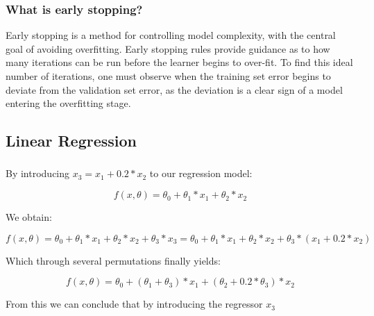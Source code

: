 \documentclass[12pt,a4paper]{article}
\begin{document}
\subsubsection*{What is early stopping?}

Early stopping is a method for controlling model complexity, with the central goal of avoiding overfitting. Early stopping rules provide guidance as to how many iterations can be run before the learner begins to over-fit. To find this ideal number of iterations, one must observe when the training set error begins to deviate from the validation set error, as the deviation is a clear sign of a model entering the overfitting stage.

\subsection*{Linear Regression}

\subsubsection{}

By introducing $x_3 = x_1 + 0.2 * x_2$ to our regression model:

\begin{equation*}
	f(x,\theta) = \theta_0 + \theta_1 * x_1 + \theta_2 * x_2
\end{equation*}

We obtain:

\begin{equation*}
	f(x,\theta) = \theta_0 + \theta_1 * x_1 + \theta_2 * x_2 + \theta_3 * x_3
	=
	\theta_0 + \theta_1 * x_1 + \theta_2 * x_2 + \theta_3 * (x_1 + 0.2 * x_2)
\end{equation*}

Which through several permutations finally yields:

\begin{equation*}
	f(x,\theta) =
	\theta_0 + (\theta_1 + \theta_3) * x_1 + (\theta_2 + 0.2 * \theta_3) * x_2
\end{equation*}

From this we can conclude that by introducing the regressor $x_3$

\subsubsection{}

\subsubsection{}
\end{document}
